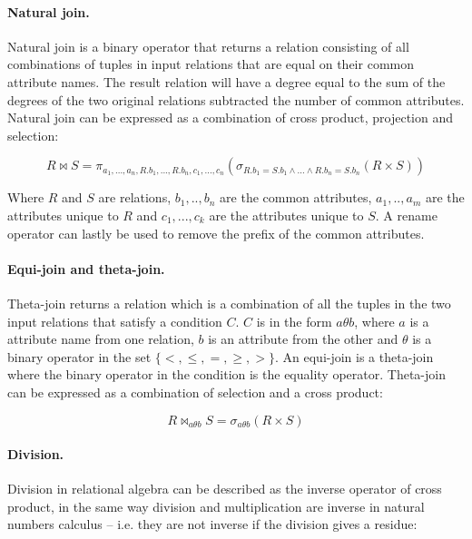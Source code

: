 \paragraph{Natural join.}
\label{sect:theory:relAlg:naturalJoin}
Natural join is a binary operator that returns a relation consisting of all combinations of tuples in input
relations that are equal on their common attribute names. The result relation will have a degree equal to the sum
of the degrees of the two original relations subtracted the number of common attributes. Natural join can be
expressed as a combination of cross product, projection and selection:

\begin{equation*}
R \bowtie S = \pi_{a_{1},..., a_{n},R.b_{1},...,R.b_{n},c_{1},...,c_{n}}( \sigma _{R.b_{1}=S.b_{1} \wedge ... \wedge R.b_{n}=S.b_{n}}(R \times S))
\end{equation*}

Where $R$ and $S$ are relations, $b_{1},..,b_{n}$ are the common attributes, $a_{1},..,a_{m}$ are the attributes
unique to $R$ and $c_{1},...,c_{k}$ are the attributes unique to $S$. A rename operator can lastly be used to
remove the prefix of the common attributes.

\paragraph{Equi-join and theta-join.}
\label{sect:theory:relAlg:equiAndThetaJoin}
Theta-join returns a relation which is a combination of all the tuples in the two input relations that satisfy a
condition $C$. $C$ is in the form $a \theta b$, where $a$ is a attribute name from one relation, $b$ is an
attribute from the other and $ \theta $ is a binary operator in the set $ \{ <, \leq , =, \geq , >  \} $. An
equi-join is a theta-join where the binary operator in the condition is the equality operator. Theta-join can be
expressed as a combination of selection and a cross product:

\begin{equation*}
R \bowtie _{a \theta b}S = \sigma _{a \theta b}(R \times S)
\end{equation*}

\paragraph{Division.}
\label{sect:theory:relAlg:division}
Division in relational algebra can be described as the inverse operator of cross product, in the same way division
and multiplication are inverse in natural numbers calculus -- i.e. they are not inverse if the division gives a
residue:

